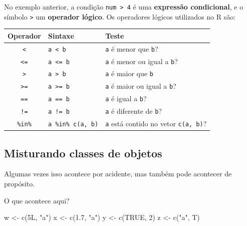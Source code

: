 \documentclass[
  10pt,
  a4paper]{book}
\newenvironment{Shaded}{\begin{snugshade}}{\end{snugshade}}
\newcommand{\ConstantTok}[1]{\textcolor[rgb]{0.00,0.00,0.00}{#1}}
\newcommand{\DecValTok}[1]{\textcolor[rgb]{0.00,0.00,0.81}{#1}}
\newcommand{\FloatTok}[1]{\textcolor[rgb]{0.00,0.00,0.81}{#1}}
\newcommand{\FunctionTok}[1]{\textcolor[rgb]{0.00,0.00,0.00}{#1}}
\newcommand{\NormalTok}[1]{#1}
\newcommand{\OtherTok}[1]{\textcolor[rgb]{0.56,0.35,0.01}{#1}}
\newcommand{\StringTok}[1]{\textcolor[rgb]{0.31,0.60,0.02}{#1}}
\begin{document}
No exemplo anterior, a condição \texttt{num\ \textgreater{}\ 4} é uma \textbf{expressão
condicional}, e o símbolo \texttt{\textgreater{}} um \textbf{operador lógico}. Os operadores
lógicos utilizados no R são:

\begin{longtable}[]{@{}cll@{}}
\toprule()
Operador & Sintaxe & Teste \\
\midrule()
\endhead
\texttt{\textless{}} & \texttt{a\ \textless{}\ b} & \texttt{a} é menor que \texttt{b}? \\
\texttt{\textless{}=} & \texttt{a\ \textless{}=\ b} & \texttt{a} é menor ou igual a \texttt{b}? \\
\texttt{\textgreater{}} & \texttt{a\ \textgreater{}\ b} & \texttt{a} é maior que \texttt{b} \\
\texttt{\textgreater{}=} & \texttt{a\ \textgreater{}=\ b} & \texttt{a} é maior ou igual a \texttt{b}? \\
\texttt{==} & \texttt{a\ ==\ b} & \texttt{a} é igual a \texttt{b}? \\
\texttt{!=} & \texttt{a\ !=\ b} & \texttt{a} é diferente de \texttt{b}? \\
\texttt{\%in\%} & \texttt{a\ \%in\%\ c(a,\ b)} & \texttt{a} está contido no vetor \texttt{c(a,\ b)}? \\
\bottomrule()
\end{longtable}

\hypertarget{misturando-classes-de-objetos}{%
\subsection{Misturando classes de objetos}\label{misturando-classes-de-objetos}}

Algumas vezes isso acontece por acidente, mas também pode acontecer de
propósito.

O que acontece aqui?

\begin{Shaded}
\begin{Highlighting}[]
\NormalTok{w }\OtherTok{\textless{}{-}} \FunctionTok{c}\NormalTok{(5L, }\StringTok{"a"}\NormalTok{)}
\NormalTok{x }\OtherTok{\textless{}{-}} \FunctionTok{c}\NormalTok{(}\FloatTok{1.7}\NormalTok{, }\StringTok{"a"}\NormalTok{)}
\NormalTok{y }\OtherTok{\textless{}{-}} \FunctionTok{c}\NormalTok{(}\ConstantTok{TRUE}\NormalTok{, }\DecValTok{2}\NormalTok{)}
\NormalTok{z }\OtherTok{\textless{}{-}} \FunctionTok{c}\NormalTok{(}\StringTok{"a"}\NormalTok{, T)}
\end{Highlighting}
\end{Shaded}
\end{document}
